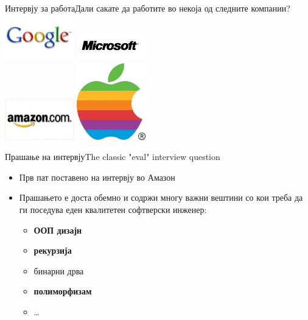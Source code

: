 
\begin{frame}{Интервју за работа}{Дали сакате да работите во некоја од следните
компании?}
\includegraphics[width=3cm]{images/google}\hfill
\includegraphics[width=3cm]{images/microsoft}\\
\includegraphics[width=3cm]{images/amazon}\hfill
\includegraphics[width=3cm]{images/apple}
\end{frame}

\begin{frame}{Прашање на интервју}{The classic "eval"
interview question}
\begin{itemize}
  \item Прв пат поставено на интервју во Амазон
  \item Прашањето е доста обемно и содржи многу важни вештини со кои треба да ги
  поседува еден квалитетен софтверски инженер:
  \begin{itemize}
  \item \textbf{ООП дизајн}
  \item \textbf{рекурзија}
  \item бинарни дрва
  \item \textbf{полиморфизам}
  \item \ldots
  \end{itemize}
\end{itemize}
\end{frame}

